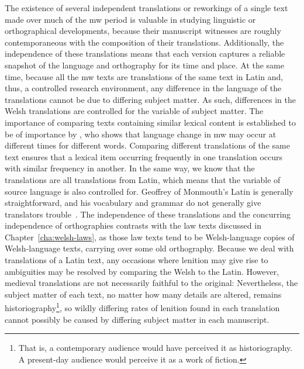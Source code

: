 The existence of several independent translations or reworkings of a single text made over much of the \gls{mw} period is valuable in studying linguistic or orthographical developments, because their manuscript witnesses are roughly contemporaneous with the composition of their translations.
Additionally, the independence of these translations means that each version captures a reliable snapshot of the language and orthography for its time and place.
At the same time, because all the \gls{mw} texts are translations of the same text in Latin and, thus, a controlled research environment,  any difference in the language of the translations cannot be due to differing subject matter.
As such, differences in the Welsh translations are controlled for the variable of subject matter.
The importance of comparing texts containing similar lexical content is established to be of importance by \textcite{Wil_Lexical05}, who shows that language change in \gls{mw} may occur at different times for different words.
Comparing different translations of the same text ensures that a lexical item occurring frequently in one translation  occurs with similar frequency in another.
In the same way, we know that the translations  are all translations from Latin, which means that the variable of source language is also controlled for.
Geoffrey of Monmouth's Latin is generally straightforward, and his vocabulary and grammar do not generally give translators trouble~\autocite[lxxvi]{Geo_History09}.
The independence of these translations and the concurring independence of orthographies contrasts with the law texts discussed in Chapter~\ref{cha:welsh-laws}, as those law texts tend to be Welsh-language copies of Welsh-language texts, carrying over some old orthography.
Because we deal with translations of a Latin text, any occasions where lenition may give rise to ambiguities may be resolved by comparing the Welsh to the Latin.
However, medieval translations are not necessarily faithful to the original:
Nevertheless, the subject matter of each text, no matter how many details are altered, remains historiography\footnote{That is, a contemporary audience would have perceived it as historiography. A present-day audience would perceive it as a work of fiction.}, so wildly differing rates of lenition found in each translation cannot possibly be caused by differing subject matter  in each manuscript.

